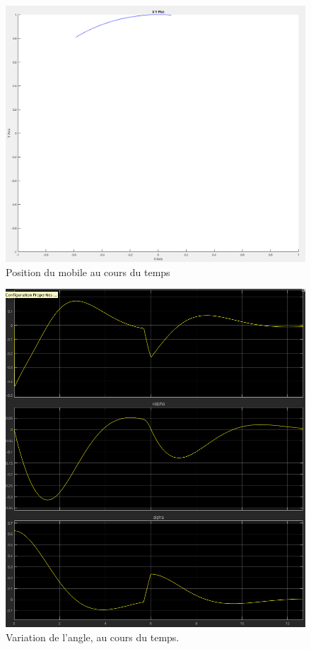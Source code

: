 \documentclass[11pt]{article}
\begin{document}
\begin{figure}[h!]
	\includegraphics[scale=0.2]{images/pendule_inverse_xy}
	\caption{Position du mobile au cours du temps}
\end{figure}
\begin{figure}[h!]
	\includegraphics[scale=0.25]{images/pendule_inverse_graph}
	\caption{Variation de l'angle, au cours du temps.}
\end{figure}
\end{document}
